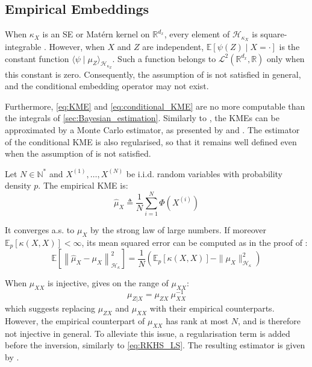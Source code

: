 \subsection{Empirical Embeddings}

When $\kappa_X$ is an SE or Matérn kernel on $\mathbb{R}^{d_x}$, every element of $\mathcal{H}_{\kappa_X}$ is square-integrable \cite{bib:Wendland}. However, when $X$ and $Z$ are independent, $\mathbb{E}[\psi(Z)\mid X=\cdot]$ is the constant function $\langle\psi\mid\mu_Z\rangle_{\mathcal{H}_{\kappa_Z}}$. Such a function belongs to $\mathcal{L}^2(\mathbb{R}^{d_x},\mathbb{R})$ only when this constant is zero. Consequently, the assumption of  is not satisfied in general, and the conditional embedding operator may not exist.

Furthermore, \eqref{eq:KME} and \eqref{eq:conditional_KME} are no more computable than the integrals of \cref{sec:Bayesian_estimation}. Similarly to , the KMEs can be approximated by a Monte Carlo estimator, as presented by  and . The estimator of the conditional KME is also regularised, so that it remains well defined even when the assumption of  is not satisfied.

\begin{definition}\label{th:KME_MC}
	Let $N\in\mathbb{N}^*$ and $X^{(1)},\dots,X^{(N)}$ be i.i.d. random variables with probability density $p$. The empirical KME is:
	\begin{equation}
		\hat{\mu}_X\triangleq\frac{1}{N}\sum_{i=1}^N\Phi\left(X^{(i)}\right)
	\end{equation}

	It converges a.s. to $\mu_X$ by the strong law of large numbers. If moreover $\mathbb{E}_p\left[\kappa(X,X)\right]<\infty$, its mean squared error can be computed as in the proof of :
	\begin{equation}
		\mathbb{E}\left[\left\|\hat{\mu}_X-\mu_X\right\|_{\mathcal{H}_\kappa}^2\right]=\frac{1}{N}\left(\mathbb{E}_p\left[\kappa(X,X)\right]-\|\mu_X\|_{\mathcal{H}_\kappa}^2\right)
	\end{equation}
\end{definition}

When $\mu_{XX}$ is injective,  gives on the range of $\mu_{XX}$:
\begin{equation}
	\mu_{Z|X}=\mu_{ZX}\:\mu_{XX}^{-1}
\end{equation}
which suggests replacing $\mu_{ZX}$ and $\mu_{XX}$ with their empirical counterparts. However, the empirical counterpart of $\mu_{XX}$ has rank at most $N$, and is therefore not injective in general. To alleviate this issue, a regularisation term is added before the inversion, similarly to \eqref{eq:RKHS_LS}. The resulting estimator is given by .

